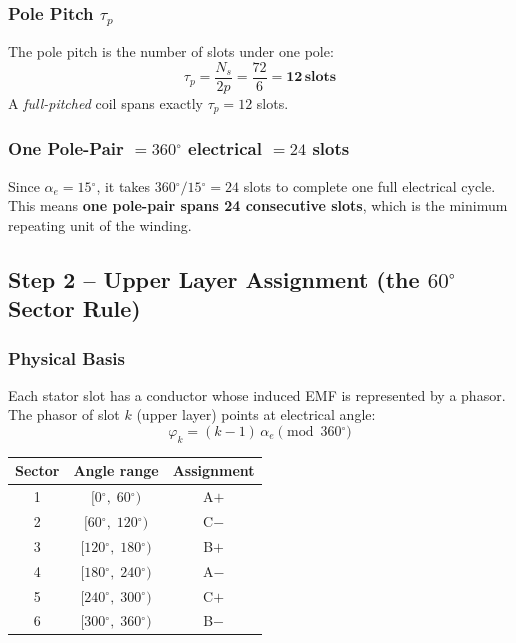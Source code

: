 \documentclass[12pt,a4paper]{article}
\newcommand{\degree}{\ensuremath{^{\circ}}}
\begin{document}
\subsubsection{Pole Pitch $\tau_p$}

The pole pitch is the number of slots under one pole:
\begin{equation}
  \boxed{\tau_p = \frac{N_s}{2p}}
  = \frac{72}{6} = \mathbf{12\,\text{slots}}
  \label{eq:tau_p}
\end{equation}
A \emph{full-pitched} coil spans exactly $\tau_p = 12$ slots.

\subsubsection{One Pole-Pair $= 360\degree$ electrical $= 24$ slots}

Since $\alpha_e = 15\degree$, it takes $360\degree / 15\degree = 24$ slots
to complete one full electrical cycle.
This means \textbf{one pole-pair spans 24 consecutive slots}, which is the
minimum repeating unit of the winding.

\subsection{Step 2 -- Upper Layer Assignment (the $60\degree$ Sector Rule)}

\subsubsection{Physical Basis}

Each stator slot has a conductor whose induced EMF is represented by a phasor.
The phasor of slot $k$ (upper layer) points at electrical angle:
\begin{equation}
  \varphi_k = (k-1)\,\alpha_e \pmod{360\degree}
  \label{eq:slot_angle}
\end{equation}


\begin{center}
\begin{tabular}{ccc}
  \toprule
  Sector & Angle range & Assignment \\
  \midrule
  1 & $[0\degree,\;60\degree)$   & A$+$ \\
  2 & $[60\degree,\;120\degree)$ & C$-$ \\
  3 & $[120\degree,\;180\degree)$& B$+$ \\
  4 & $[180\degree,\;240\degree)$& A$-$ \\
  5 & $[240\degree,\;300\degree)$& C$+$ \\
  6 & $[300\degree,\;360\degree)$& B$-$ \\
  \bottomrule
\end{tabular}
\end{center}
\end{document}
